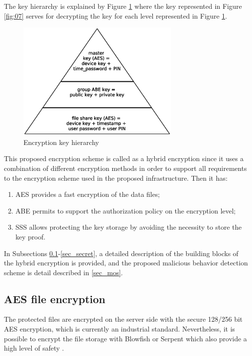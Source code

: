 \documentclass[twocolumn]{svjour3}          	%
\begin{document}
The key hierarchy is explained by Figure \ref{fig:08} where the key represented in Figure \ref{fig:07} serves for decrypting the key for each level represented in Figure \ref{fig:08}.

\begin{figure}[h!]
	\centering
	\includegraphics[width=8cm]{fig08.eps}
	\caption{Encryption key hierarchy}
	\label{fig:08}
\end{figure}

This proposed encryption scheme is called as a hybrid encryption since it uses a combination of different encryption methods in order to support all requirements to the encryption scheme used in the proposed infrastructure. Then it has:

\begin{enumerate}
	\item AES provides a fast encryption of the data files;
	\item ABE permits to support the authorization policy on the encryption level;
	\item SSS allows protecting the key storage by avoiding the necessity to store the key proof.
\end{enumerate}

In Subsections \ref{sec_aes}-\ref{sec_secret}, a detailed description of the building blocks of the hybrid encryption is provided, and the proposed malicious behavior detection scheme is detail described in \ref{sec_mos}.

\subsection{AES file encryption }
\label{sec_aes}
The protected files are encrypted on the server side with the secure 128/256 bit AES encryption, which is currently an industrial standard. Nevertheless, it is possible to encrypt the file storage with Blowfish or Serpent which also provide a high level of safety \cite{nist2000}. 
\end{document}

